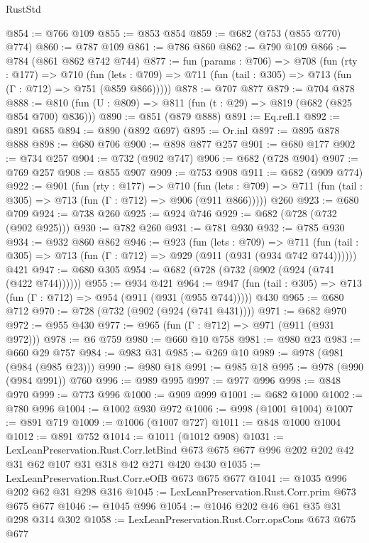 \begin{lexlean}{RustStd}
\begin{coremodule}
@854 := @766 @109
@855 := @853 @854
@859 := @682 (@753 (@855 @770) @774)
@860 := @787 @109
@861 := @786 @860
@862 := @790 @109
@866 := @784 (@861 @862 @742 @744)
@877 := fun (params : @706) =>
  @708
    (fun (rty : @177) =>
    @710
      (fun (lets : @709) => @711 (fun (tail : @305) => @713 (fun (Γ : @712) => @751 (@859 @866)))))
@878 := @707 @877
@879 := @704 @878
@888 := @810 (fun (U : @809) => @811 (fun (t : @29) => @819 (@682 (@825 @854 @700) @836)))
@890 := @851 (@879 @888)
@891 := Eq.refl.{1}
@892 := @891 @685
@894 := @890 (@892 @697)
@895 := Or.inl
@897 := @895 @878 @888
@898 := @680 @706
@900 := @898 @877 @257
@901 := @680 @177
@902 := @734 @257
@904 := @732 (@902 @747)
@906 := @682 (@728 @904)
@907 := @769 @257
@908 := @855 @907
@909 := @753 @908
@911 := @682 (@909 @774)
@922 := @901
    (fun (rty : @177) =>
    @710
      (fun (lets : @709) => @711 (fun (tail : @305) => @713 (fun (Γ : @712) => @906 (@911 @866)))))
    @260
@923 := @680 @709
@924 := @738 @260
@925 := @924 @746
@929 := @682 (@728 (@732 (@902 @925)))
@930 := @782 @260
@931 := @781 @930
@932 := @785 @930
@934 := @932 @860 @862
@946 := @923
    (fun (lets : @709) =>
    @711 (fun (tail : @305) => @713 (fun (Γ : @712) => @929 (@911 (@931 (@934 @742 @744))))))
    @421
@947 := @680 @305
@954 := @682 (@728 (@732 (@902 (@924 (@741 (@422 @744))))))
@955 := @934 @421
@964 := @947 (fun (tail : @305) => @713 (fun (Γ : @712) => @954 (@911 (@931 (@955 @744))))) @430
@965 := @680 @712
@970 := @728 (@732 (@902 (@924 (@741 @431))))
@971 := @682 @970
@972 := @955 @430
@977 := @965 (fun (Γ : @712) => @971 (@911 (@931 @972)))
@978 := @6 @759
@980 := @660 @10 @758
@981 := @980 @23
@983 := @660 @29 @757
@984 := @983 @31
@985 := @269 @10
@989 := @978 (@981 (@984 (@985 @23)))
@990 := @980 @18
@991 := @985 @18
@995 := @978 (@990 (@984 @991)) @760
@996 := @989 @995
@997 := @977 @996
@998 := @848 @970
@999 := @773 @996
@1000 := @909 @999
@1001 := @682 @1000
@1002 := @780 @996
@1004 := @1002 @930 @972
@1006 := @998 (@1001 @1004)
@1007 := @891 @719
@1009 := @1006 (@1007 @727)
@1011 := @848 @1000 @1004
@1012 := @891 @752
@1014 := @1011 (@1012 @908)
@1031 := LexLeanPreservation.Rust.Corr.letBind
    @673
    @675
    @677
    @996
    @202
    @202
    @42
    @31
    @62
    @107
    @31
    @318
    @42
    @271
    @420
    @430
@1035 := LexLeanPreservation.Rust.Corr.eOfB @673 @675 @677
@1041 := @1035 @996 @202 @62 @31 @298 @316
@1045 := LexLeanPreservation.Rust.Corr.prim @673 @675 @677
@1046 := @1045 @996
@1054 := @1046 @202 @46 @61 @35 @31 @298 @314 @302
@1058 := LexLeanPreservation.Rust.Corr.opsCons @673 @675 @677

\end{coremodule}
\end{lexlean}
